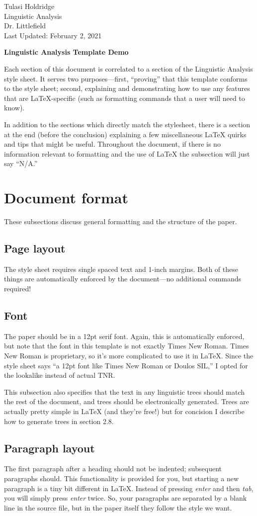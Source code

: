 \documentclass[12pt]{article}
\newcommand{\titletext}[1]
{\begin{center}
		\textbf{#1}
\end{center}}
\newcommand{\headertext}[4]
{\begin{flushleft}
		#1
		\\ #2
		\\ #3
		\\ #4
\end{flushleft}}
\begin{document}
	
	\headertext{Tulasi Holdridge}{Linguistic Analysis}{Dr. Littlefield}{Last Updated: February 2, 2021}
	
	\titletext{Linguistic Analysis Template Demo}
	Each section of this document is correlated to a section of the Linguistic Analysis style sheet. It serves two purposes---first, ``proving'' that this template conforms to the style sheet; second, explaining and demonstrating how to use any features that are LaTeX-specific (such as formatting commands that a user will need to know).
	
	In addition to the sections which directly match the stylesheet, there is a section at the end (before the conclusion) explaining a few miscellaneous LaTeX quirks and tips that might be useful. Throughout the document, if there is no information relevant to formatting and the use of LaTeX the subsection will just say ``N/A.''
	
	\section{Document format}
	These subsections discuss general formatting and the structure of the paper.
	
	\subsection{Page layout}
	The style sheet requires single spaced text and 1-inch margins. Both of these things are automatically enforced by the document---no additional commands required!
	
	\subsection{Font}
	The paper should be in a 12pt serif font. Again, this is automatically enforced, but note that the font in this template is not exactly Times New Roman. Times New Roman is proprietary, so it's more complicated to use it in LaTeX. Since the style sheet says ``a 12pt font like Times New Roman or Doulos SIL,'' I opted for the lookalike instead of actual TNR.
	
	This subsection also specifies that the text in any linguistic trees should match the rest of the document, and trees should be electronically generated. Trees are actually pretty simple in LaTeX (and they're free!) but for concision I describe how to generate trees in section 2.8.
	
	\subsection{Paragraph layout}
	The first paragraph after a heading should not be indented; subsequent paragraphs should. This functionality is provided for you, but starting a new paragraph is a tiny bit different in LaTeX. Instead of pressing \textit{enter} and then \textit{tab}, you will simply press \textit{enter} twice. So, your paragraphs are separated by a blank line in the source file, but in the paper itself they follow the style we want.
	
\end{document}
